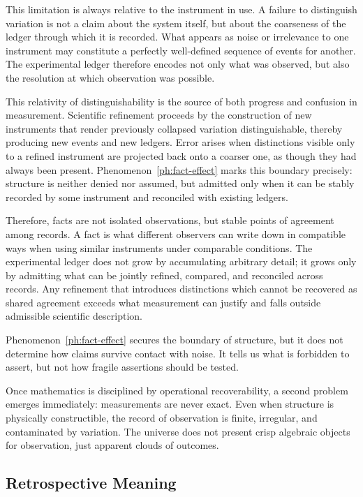 This limitation is always relative to the instrument in use. A failure to
distinguish variation is not a claim about the system itself, but about the
coarseness of the ledger through which it is recorded. What appears as noise or
irrelevance to one instrument may constitute a perfectly well-defined sequence
of events for another. The experimental ledger therefore encodes not only what
was observed, but also the resolution at which observation was possible.

This relativity of distinguishability is the source of both progress and
confusion in measurement. Scientific refinement proceeds by the construction of
new instruments that render previously collapsed variation distinguishable,
thereby producing new events and new ledgers. Error arises when distinctions
visible only to a refined instrument are projected back onto a coarser one, as
though they had always been present. Phenomenon~\ref{ph:fact-effect} marks this
boundary precisely: structure is neither denied nor assumed, but admitted only
when it can be stably recorded by some instrument and reconciled with existing
ledgers.

Therefore, facts are not isolated observations, but stable points of agreement
among records. A fact is what different observers can write down in compatible
ways when using similar instruments under comparable conditions. The
experimental ledger does not grow by accumulating arbitrary detail; it grows
only by admitting what can be jointly refined, compared, and reconciled across
records. Any refinement that introduces distinctions which cannot be recovered
as shared agreement exceeds what measurement can justify and falls outside
admissible scientific description.

Phenomenon~\ref{ph:fact-effect} secures the boundary of structure, but it
does not determine how claims survive contact with noise.  It tells us what
is forbidden to assert, but not how fragile assertions should be tested.

Once mathematics is disciplined by operational recoverability, a second
problem emerges immediately: measurements are never exact.  Even
when structure is physically constructible, the record of observation is
finite, irregular, and contaminated by variation.  The universe does not
present crisp algebraic objects for observation, just apparent clouds of outcomes.

\subsection{Retrospective Meaning}

